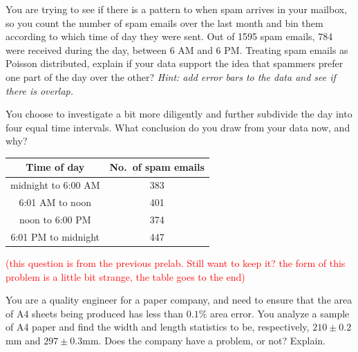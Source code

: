\documentclass[addpoints]{physlabs}  %
\date{\today}
\begin{document}
\maketitle
\begin{prelab}

\question[2] You are trying to see if there is a pattern to when spam arrives in your mailbox, so you count the number of spam emails over the last month and bin them according to which time of day they were sent.
Out of 1595 spam emails, 784 were received during the day, between 6 AM and 6 PM.
Treating spam emails as Poisson distributed, explain if your data support the idea that spammers prefer one part of the day over the other?
\textit{Hint: add error bars to the data and see if there is overlap.}
\begin{solution}[3cm]
\end{solution}

\question[2] You choose to investigate a bit more diligently and further subdivide the day into four equal time intervals.
What conclusion do you draw from your data now, and why?

\begin{center}
\begin{tabular}{c|c}
    Time of day & No.\ of spam emails \\ \hline
    midnight to 6:00 AM  & 383 \\
    6:01 AM to noon      & 401 \\
    noon to 6:00 PM      & 374 \\
    6:01 PM to midnight  & 447
\end{tabular}
\end{center}

\textcolor{red}{(this question is from the previous prelab. Still want to keep it? the form of this problem is a little bit strange, the table goes to the end)}
\begin{solution}[3cm]
\end{solution}

\question[2] You are a quality engineer for a paper company, and need to ensure that the area of A4 sheets being produced has less than $0.1\%$ area error.
 You analyze a sample of A4 paper and find the width and length statistics to be, respectively, $210\pm 0.2$mm and $297\pm 0.3$mm.
 Does the company have a problem, or not? Explain.
\begin{solution}[3cm]
\end{solution}

\end{prelab}
\end{document}
